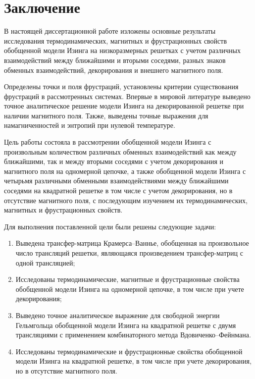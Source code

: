 \chapter*{Заключение}                       %


В настоящей диссертационной работе изложены основные результаты исследования термодинамических, магнитных и фрустрационных свойств обобщенной модели Изинга на низкоразмерных решетках с учетом различных взаимодействий между ближайшими и вторыми соседями, разных знаков обменных взаимодействий, декорирования и внешнего магнитного поля.

Определены точки и поля фрустраций, установлены критерии существования фрустраций в рассмотренных системах. Впервые в мировой литературе выведено точное аналитическое решение модели Изинга на  декорированной решетке при наличии магнитного поля. Также, выведены точные выражения для намагниченностей и энтропий при нулевой температуре.

Цель работы состояла в рассмотрении обобщенной модели Изинга с произвольным количеством различных обменных взаимодействий как между ближайшими, так и между вторыми соседями с учетом декорирования и магнитного поля на одномерной цепочке, а также обобщенной модели Изинга с четырьмя различными обменными взаимодействиями между ближайшими соседями на квадратной решетке в том числе с учетом декорирования, но в отсутствие магнитного поля, с последующим изучением их термодинамических, магнитных и фрустрационных свойств.

Для выполнения поставленной цели были решены следующие задачи:
\begin{enumerate}
  	\item Выведена трансфер-матрица Крамерса--Ваннье, обобщенная на произвольное число трансляций решетки, являющаяся произведением трансфер-матриц с одной трансляцией;
	\item Исследованы термодинамические, магнитные и фрустрационные свойства обобщенной модели Изинга на одномерной цепочке, в том числе при учете декорирования;
	\item Выведено точное аналитическое выражение для свободной энергии Гельмгольца обобщенной модели Изинга на квадратной решетке с двумя трансляциями с применением комбинаторного метода Вдовиченко--Фейнмана.
	\item Исследованы термодинамические и фрустрационные свойства обобщенной модели Изинга на квадратной решетке, в том числе при учете декорирования, но в отсутствие магнитного поля.
\end{enumerate}

